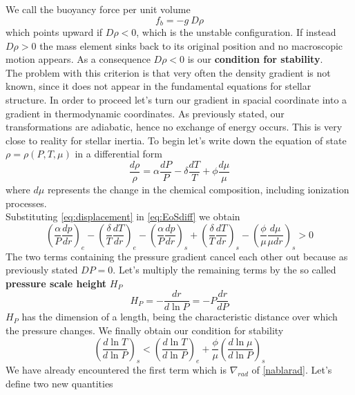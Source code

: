 We call the buoyancy force per unit volume 
$$
f_b=- g \ D \rho
$$
which points upward if $D \rho < 0$, which is the unstable configuration. If instead $D \rho > 0$ the mass element sinks back to its original position and no macroscopic motion appears. As a consequence $D \rho<0$ is our \textbf{condition for stability}.\\
The problem with this criterion is that very often the density gradient is not known, since it does not appear in the fundamental equations for stellar structure. In order to proceed let's turn our gradient in spacial coordinate into a gradient in thermodynamic coordinates. As previously stated, our transformations are adiabatic, hence no exchange of energy occurs. This is very close to reality for stellar inertia. To begin let's write down the equation of state $\rho = \rho (P, T, \mu)$ in a differential form
\begin{equation}\label{EoSdiff}
	\frac{d \rho}{\rho} = \alpha \frac{d P}{P} - \delta \frac{d T}{T} + \phi \frac{d \mu}{\mu}
\end{equation}
where $d \mu$ represents the change in the chemical composition, including ionization processes. \\
Substituting \ref{eq:displacement} in \ref{eq:EoSdiff} we obtain
\begin{equation}
	\left (\frac{\alpha}{P} \frac{dp}{dr}\right )_e - \left ( \frac{\delta}{T}\frac{dT}{dr}\right )_e -  \left (\frac{\alpha}{P} \frac{dp}{dr}\right )_s +  \left ( \frac{\delta}{T}\frac{dT}{dr}\right )_s -  \left ( \frac{\phi}{\mu}\frac{d \mu}{\mu dr}\right )_s>0 
\end{equation}
The two terms containing the pressure gradient cancel each other out because as previously stated $DP=0$. Let's multiply the remaining terms by the so called \textbf{pressure scale height} $H_P$
\begin{equation}\label{scaleheight}
	H_P=-\frac{dr}{d \ln P}= - P \frac{dr}{dP}
\end{equation}
$H_P$ has the dimension of a length, being the characteristic distance over which the pressure changes.
We finally obtain our condition for stability
\begin{equation}\label{criterionstab}
	\left (   \frac{d \ln T}{d \ln P}    \right )_s <  \left (   \frac{d \ln T}{d \ln P}   \right )_e +  \frac{\phi}{\mu} \left (   \frac{d \ln \mu}{d \ln P}    \right )_s
\end{equation}
We have already encountered the first term which is $\nabla_{rad}$ of \ref{nablarad}.
Let's define two new quantities

